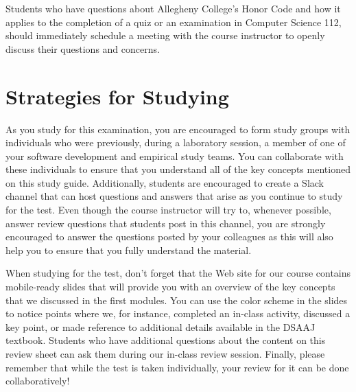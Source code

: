 \noindent Students who have questions about Allegheny College's Honor Code and how it applies to the completion of a
quiz or an examination in Computer Science 112, should immediately schedule a meeting with the course instructor to
openly discuss their questions and concerns.

\vspace*{-.2in}
\section*{Strategies for Studying}
\vspace*{-.1in}

As you study for this examination, you are encouraged to form study groups with individuals who were previously, during
a laboratory session, a member of one of your software development and empirical study teams. You can collaborate with
these individuals to ensure that you understand all of the key concepts mentioned on this study guide. Additionally,
students are encouraged to create a Slack channel that can host questions and answers that arise as you continue to
study for the test.  Even though the course instructor will try to, whenever possible, answer review questions that
students post in this channel, you are strongly encouraged to answer the questions posted by your colleagues as this
will also help you to ensure that you fully understand the material.


When studying for the test, don't forget that the Web site for our course contains mobile-ready slides that will provide
you with an overview of the key concepts that we discussed in the first modules. You can use the color scheme in the
slides to notice points where we, for instance, completed an in-class activity, discussed a key point, or made reference
to additional details available in the DSAAJ textbook. Students who have additional questions about the content on this
review sheet can ask them during our in-class review session. Finally, please remember that while the test is taken
individually, your review for it can be done collaboratively!


